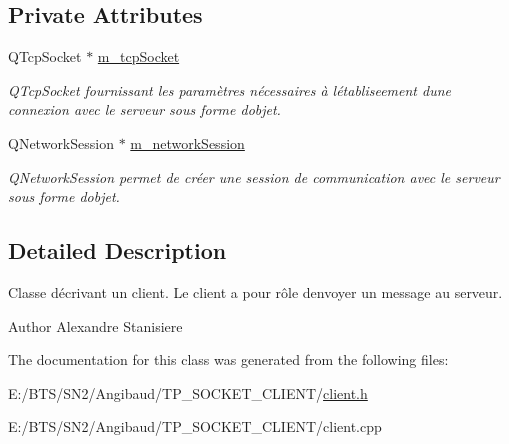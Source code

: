 \subsection*{Private Attributes}
\begin{DoxyCompactItemize}
\item 
\mbox{\label{class_client_a7a4be02c7064314761fb11c2cf43c483}} 
Q\+Tcp\+Socket $\ast$ \mbox{\hyperlink{class_client_a7a4be02c7064314761fb11c2cf43c483}{m\+\_\+tcp\+Socket}}
\begin{DoxyCompactList}\small\item\em Q\+Tcp\+Socket fournissant les paramètres nécessaires à l\textquotesingle{}établiseement d\textquotesingle{}une connexion avec le serveur sous forme d\textquotesingle{}objet. \end{DoxyCompactList}\item 
\mbox{\label{class_client_af41d2cbd7c1a4c83c09599682ed358df}} 
Q\+Network\+Session $\ast$ \mbox{\hyperlink{class_client_af41d2cbd7c1a4c83c09599682ed358df}{m\+\_\+network\+Session}}
\begin{DoxyCompactList}\small\item\em Q\+Network\+Session permet de créer une session de communication avec le serveur sous forme d\textquotesingle{}objet. \end{DoxyCompactList}\end{DoxyCompactItemize}


\subsection{Detailed Description}
Classe décrivant un client. Le client a pour rôle d\textquotesingle{}envoyer un message au serveur. 

\begin{DoxyAuthor}{Author}
Alexandre Stanisiere 
\end{DoxyAuthor}


The documentation for this class was generated from the following files\+:\begin{DoxyCompactItemize}
\item 
E\+:/\+B\+T\+S/\+S\+N2/\+Angibaud/\+T\+P\+\_\+\+S\+O\+C\+K\+E\+T\+\_\+\+C\+L\+I\+E\+N\+T/\mbox{\hyperlink{client_8h}{client.\+h}}\item 
E\+:/\+B\+T\+S/\+S\+N2/\+Angibaud/\+T\+P\+\_\+\+S\+O\+C\+K\+E\+T\+\_\+\+C\+L\+I\+E\+N\+T/client.\+cpp\end{DoxyCompactItemize}
